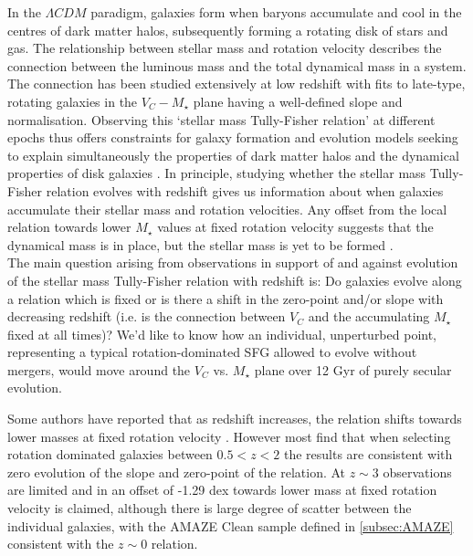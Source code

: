 \documentclass[fleqn,usenatbib]{mn2e}
\begin{document}
In the $\Lambda CDM$ paradigm, galaxies form when baryons accumulate and cool in the centres of dark matter halos, subsequently forming a rotating disk of stars and gas.
The relationship between stellar mass and rotation velocity describes the connection between the luminous mass and the total dynamical mass in a system.
The connection has been studied extensively at low redshift \citep[e.g.][]{Bell2000a,Rhee2003,Reyes2011} with fits to late-type, rotating galaxies in the $V_{C}-M_{\star}$ plane having a well-defined slope and normalisation.
Observing this `stellar mass Tully-Fisher relation' at different epochs thus offers constraints for galaxy formation and evolution models seeking to explain simultaneously the properties of dark matter halos and the dynamical properties of disk galaxies \citep[e.g.][]{Dubois2014a,Vogelsberger2014b,Schaye2015}.
In principle, studying whether the stellar mass Tully-Fisher relation evolves with redshift gives us information about when galaxies accumulate their stellar mass and rotation velocities.
Any offset from the local relation towards lower $M_{\star}$ values at fixed rotation velocity suggests that the dynamical mass is in place, but the stellar mass is yet to be formed \citep[e.g.][]{Puech2008,Cresci2009,Puech2010,Gnerucci2011,Tiley2016a}. \\

The main question arising from observations in support of and against evolution of the stellar mass Tully-Fisher relation with redshift is: Do galaxies evolve along a relation which is fixed or is there a shift in the zero-point and/or slope with decreasing redshift (i.e. is the connection between $V_{C}$ and the accumulating $M_{\star}$ fixed at all times)?
We'd like to know how an individual, unperturbed point, representing a typical rotation-dominated SFG allowed to evolve without mergers, would move around the $V_{C}$ vs. $M_{\star}$ plane over 12 Gyr of purely secular evolution. 

Some authors have reported that as redshift increases, the relation shifts towards lower masses at fixed rotation velocity \citep[e.g.][]{Puech2008,Cresci2009,Puech2010}.
However most find that when selecting rotation dominated galaxies between $0.5 < z < 2$ \citep[e.g.][]{Flores2006,Miller2011,Kassin2012,Miller2012,Vergani2012,Miller2014,Contini2015a,Molina2016,Pelliccia2016,DiTeodoro2016,Harrison2017} the results are consistent with zero evolution of the slope and zero-point of the relation.
At $z\sim 3$ observations are limited and in \cite{Gnerucci2011} an offset of -1.29 dex towards lower mass at fixed rotation velocity is claimed, although there is large degree of scatter between the individual galaxies, with the AMAZE Clean sample defined in \cref{subsec:AMAZE} consistent with the $z\sim0$ relation. \\
\end{document}
